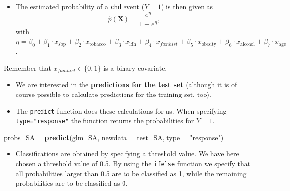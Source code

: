 \documentclass[10pt,ignorenonframetext,]{beamer}
\newenvironment{Shaded}{\begin{snugshade}}{\end{snugshade}}
\newcommand{\KeywordTok}[1]{\textcolor[rgb]{0.13,0.29,0.53}{\textbf{#1}}}
\newcommand{\DataTypeTok}[1]{\textcolor[rgb]{0.13,0.29,0.53}{#1}}
\newcommand{\StringTok}[1]{\textcolor[rgb]{0.31,0.60,0.02}{#1}}
\newcommand{\NormalTok}[1]{#1}
\providecommand{\tightlist}{%
  \setlength{\itemsep}{0pt}\setlength{\parskip}{0pt}}
\begin{document}
\begin{frame}[fragile]

\begin{itemize}
\tightlist
\item
  The estimated probability of a \texttt{chd} event (\(Y=1\)) is then
  given as \[\hat{p}(\mathbf{X}) =\frac{e^\eta}{1+e^\eta} ,\] with
  \(\eta=\beta_0 + \beta_1 \cdot x_{\text{sbp}} + \beta_2\cdot x_{\text{tobacco}} + \beta_3 \cdot x_\text{ldh} + \beta_4 \cdot x_{famhist} + \beta_5\cdot x_\text{obesity} + \beta_6\cdot x_\text{alcohol} + \beta_7\cdot x_{\text{age}}\).
\end{itemize}

\hspace{6mm} Remember that \(x_{famhist} \in \{0,1\}\) is a binary
covariate.

\vspace{2mm}

\begin{itemize}
\tightlist
\item
  We are interested in the \textbf{predictions for the test set}
  (although it is of course possible to calculate predictions for the
  training set, too).
\end{itemize}

\end{frame}

\begin{frame}[fragile]

\begin{itemize}
\tightlist
\item
  The \texttt{predict} function does these calculations for us. When
  specifying \texttt{type="response"} the function returns the
  probabilities for \(Y=1\).
\end{itemize}

\scriptsize

\begin{Shaded}
\begin{Highlighting}[]
\NormalTok{probs_SA =}\StringTok{ }\KeywordTok{predict}\NormalTok{(glm_SA, }\DataTypeTok{newdata =}\NormalTok{ test_SA, }\DataTypeTok{type =} \StringTok{"response"}\NormalTok{)}
\end{Highlighting}
\end{Shaded}

\normalsize

\begin{itemize}
\tightlist
\item
  Classifications are obtained by specifying a threshold value. We have
  here chosen a threshold value of 0.5. By using the \texttt{ifelse}
  function we specify that all probabilities larger than 0.5 are to be
  classified as 1, while the remaining probabilities are to be
  classified as 0.
\end{itemize}

\end{frame}
\end{document}
